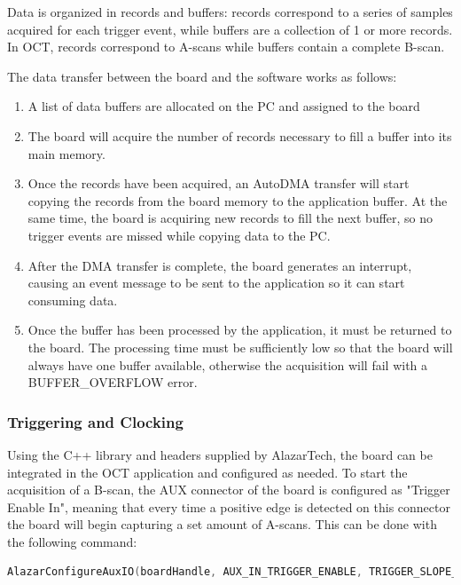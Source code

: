 Data is organized in records and buffers: records correspond to a series of samples acquired for each trigger event, while buffers are a collection of 1 or more records. In OCT, records correspond to A-scans while buffers contain a complete B-scan. 

The data transfer between the board and the software works as follows:
\begin{enumerate}
	\item A list of data buffers are allocated on the PC and assigned to the board

	\item The board will acquire the number of records necessary to fill a buffer into its main memory. 

	\item Once the records have been acquired, an AutoDMA transfer will start copying the records from the board memory to the application buffer. At the same time, the board is acquiring new records to fill the next buffer, so no trigger events are missed while copying data to the PC.

	\item After the DMA transfer is complete, the board generates an interrupt, causing an event message to be sent to the application so it can start consuming data. 
	
	\item Once the buffer has been processed by the application, it must be returned to the board. The processing time must be sufficiently low so that the board will always have one buffer available, otherwise the acquisition will fail with a BUFFER\_OVERFLOW error.
\end{enumerate}


\subsubsection{Triggering and Clocking}
Using the C++ library and headers supplied by AlazarTech, the board can be integrated in the OCT application and configured as needed. To start the acquisition of a B-scan, the AUX connector of the board is configured as "Trigger Enable In", meaning that every time a positive edge is detected on this connector the board will begin capturing a set amount of A-scans. This can be done with the following command:

\begin{lstlisting}[language=C,frame=tb]
AlazarConfigureAuxIO(boardHandle, AUX_IN_TRIGGER_ENABLE, TRIGGER_SLOPE_POSITIVE);
\end{lstlisting}

